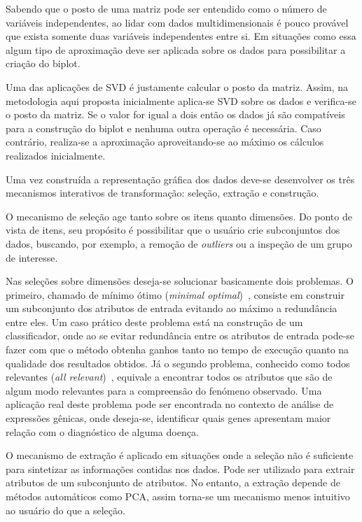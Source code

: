Sabendo que o posto de uma matriz pode ser entendido como o
número de variáveis independentes, ao lidar com dados
multidimensionais é pouco provável que exista somente duas
variáveis independentes entre si. Em situações como essa
algum tipo de aproximação deve ser aplicada sobre os dados
para possibilitar a criação do biplot. 








Uma das aplicações de SVD é justamente calcular o posto da
matriz. Assim, na metodologia aqui proposta inicialmente
aplica-se SVD sobre os dados e verifica-se o posto da
matriz. Se o valor for igual a dois então os dados já são
compatíveis para a construção do biplot e nenhuma outra
operação é necessária. Caso contrário, realiza-se a
aproximação aproveitando-se ao máximo os cálculos realizados
inicialmente.

Uma vez construída a representação gráfica dos dados deve-se
desenvolver os três mecanismos interativos de transformação:
seleção, extração e construção.

O mecanismo de seleção age tanto sobre os itens quanto
dimensões. Do ponto de vista de itens, seu propósito é
possibilitar que o usuário crie subconjuntos dos dados,
buscando, por exemplo, a remoção de \emph{outliers} ou a
inspeção de um grupo de interesse. 

Nas seleções sobre dimensões deseja-se solucionar
basicamente dois problemas. O primeiro, chamado de mínimo
ótimo (\emph{minimal optimal})~\cite{Kohavi1997}, consiste
em construir um subconjunto dos atributos de entrada
evitando ao máximo a redundância entre eles. Um caso prático
deste problema está na construção de um classificador,
onde ao se evitar redundância entre os atributos de entrada
pode-se fazer com que o método obtenha ganhos tanto no tempo de
execução quanto na qualidade dos resultados obtidos. Já o
segundo problema, conhecido como todos relevantes (\emph{all
relevant})~\cite{Nilsson2007}, equivale a encontrar todos os
atributos que são de algum modo relevantes para a
compreensão do fenómeno observado. Uma aplicação real deste
problema pode ser encontrada no contexto de análise
de expressões gênicas, onde deseja-se,
identificar quais genes apresentam maior relação com o
diagnóstico de alguma doença. 

O mecanismo de extração é aplicado em situações onde a
seleção não é suficiente para sintetizar as informações
contidas nos dados. Pode ser utilizado para extrair
atributos de um subconjunto de atributos. No entanto, a
extração depende de métodos automáticos como PCA, assim
torna-se um mecanismo menos intuitivo ao usuário do que a
seleção. 

